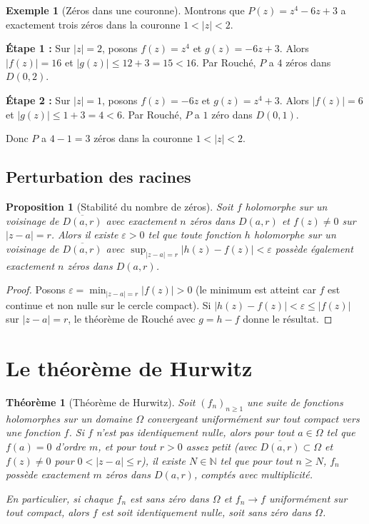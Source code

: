 \documentclass[12pt,a4paper,openany]{book}
\theoremstyle{definition}
\newtheorem{exemple}[definition]{Exemple}
\theoremstyle{plain}
\newtheorem{theoreme}[definition]{Théorème}
\newtheorem{proposition}[definition]{Proposition}
\theoremstyle{remark}
\newcommand{\N}{\mathbb{N}}
\newcommand{\abs}[1]{\left|#1\right|}
\begin{document}
\begin{exemple}[Zéros dans une couronne]\label{ex:rouche-couronne}
Montrons que $P(z) = z^4 - 6z + 3$ a exactement trois zéros dans la couronne
$1 < \abs{z} < 2$.

\textbf{Étape 1 :} Sur $\abs{z} = 2$, posons $f(z) = z^4$ et $g(z) = -6z + 3$.
Alors $\abs{f(z)} = 16$ et $\abs{g(z)} \leq 12 + 3 = 15 < 16$. Par Rouché,
$P$ a $4$ zéros dans $D(0,2)$.

\textbf{Étape 2 :} Sur $\abs{z} = 1$, posons $f(z) = -6z$ et $g(z) = z^4 + 3$.
Alors $\abs{f(z)} = 6$ et $\abs{g(z)} \leq 1 + 3 = 4 < 6$. Par Rouché,
$P$ a $1$ zéro dans $D(0,1)$.

Donc $P$ a $4 - 1 = 3$ zéros dans la couronne $1 < \abs{z} < 2$.
\end{exemple}

\subsection{Perturbation des racines}

\begin{proposition}[Stabilité du nombre de zéros]\label{prop:stabilite-zeros}
Soit $f$ holomorphe sur un voisinage de $\overline{D(a,r)}$ avec exactement
$n$ zéros dans $D(a,r)$ et $f(z) \neq 0$ sur $\abs{z-a} = r$. Alors il
existe $\varepsilon > 0$ tel que toute fonction $h$ holomorphe sur un voisinage
de $\overline{D(a,r)}$ avec $\sup_{\abs{z-a}=r} \abs{h(z) - f(z)} < \varepsilon$
possède également exactement $n$ zéros dans $D(a,r)$.
\end{proposition}

\begin{proof}
Posons $\varepsilon = \min_{\abs{z-a}=r} \abs{f(z)} > 0$ (le minimum est atteint
car $f$ est continue et non nulle sur le cercle compact). Si
$\abs{h(z) - f(z)} < \varepsilon \leq \abs{f(z)}$ sur $\abs{z-a} = r$,
le théorème de Rouché avec $g = h - f$ donne le résultat.
\end{proof}

\section{Le théorème de Hurwitz}\label{sec:hurwitz}

\begin{theoreme}[Théorème de Hurwitz]\label{thm:hurwitz}
Soit $(f_n)_{n \geq 1}$ une suite de fonctions holomorphes sur un domaine
$\Omega$ convergeant uniformément sur tout compact vers une fonction $f$.
Si $f$ n'est pas identiquement nulle, alors pour tout $a \in \Omega$ tel que
$f(a) = 0$ d'ordre $m$, et pour tout $r > 0$ assez petit
(avec $\overline{D(a,r)} \subset \Omega$ et $f(z) \neq 0$ pour
$0 < \abs{z-a} \leq r$), il existe $N \in \N$ tel que pour tout $n \geq N$,
$f_n$ possède exactement $m$ zéros dans $D(a,r)$, comptés avec multiplicité.

En particulier, si chaque $f_n$ est sans zéro dans $\Omega$ et $f_n \to f$
uniformément sur tout compact, alors $f$ est soit identiquement nulle, soit
sans zéro dans $\Omega$.
\end{theoreme}
\end{document}
